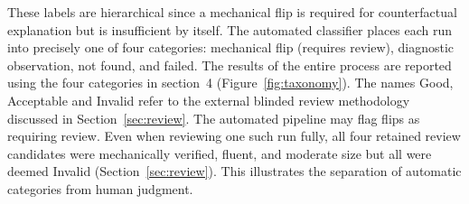 \documentclass[11pt,a4paper]{article}
\begin{document}
These labels are hierarchical since a mechanical flip is required for counterfactual
explanation but is insufficient by itself. The automated classifier places each run
into precisely one of four categories: mechanical flip (requires review), diagnostic
observation, not found, and failed. The results of the entire process are reported using
the four categories in section~4 (Figure~\ref{fig:taxonomy}). The names Good,
Acceptable and Invalid refer to the external blinded review methodology discussed in
Section~\ref{sec:review}. The automated pipeline may flag flips as requiring review.
Even when reviewing one such run fully, all four retained review candidates were
mechanically verified, fluent, and moderate size but all were deemed Invalid
(Section~\ref{sec:review}). This illustrates the separation of automatic categories
from human judgment.
\end{document}
